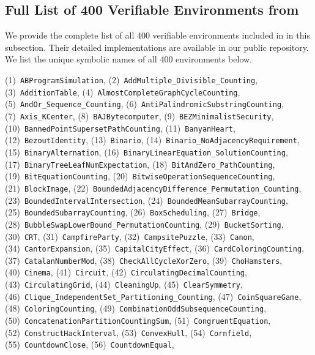 \documentclass{article}
\theoremstyle{plain}
\theoremstyle{definition}
\theoremstyle{remark}
\begin{document}
\subsection{Full List of 400 Verifiable Environments from~\suite{}}
\label{app:environment-list}

We provide the complete list of all 400 verifiable environments included in \suite{} in this subsection.
Their detailed implementations are available in our public repository.
We list the unique symbolic names of all 400 environments below.

\begin{flushleft}
(1)~\texttt{ABProgramSimulation},
(2)~\texttt{AddMultiple\_Divisible\_Counting},
(3)~\texttt{AdditionTable},
(4)~\texttt{AlmostCompleteGraphCycleCounting},
(5)~\texttt{AndOr\_Sequence\_Counting},
(6)~\texttt{AntiPalindromicSubstringCounting},
(7)~\texttt{Axis\_KCenter},
(8)~\texttt{BAJBytecomputer},
(9)~\texttt{BEZMinimalistSecurity},
(10)~\texttt{BannedPointSupersetPathCounting},
(11)~\texttt{BanyanHeart},
(12)~\texttt{BezoutIdentity},
(13)~\texttt{Binario},
(14)~\texttt{Binario\_NoAdjacencyRequirement},
(15)~\texttt{BinaryAlternation},
(16)~\texttt{BinaryLinearEquation\_SolutionCounting},
(17)~\texttt{BinaryTreeLeafNumExpectation},
(18)~\texttt{BitAndZero\_PathCounting},
(19)~\texttt{BitEquationCounting},
(20)~\texttt{BitwiseOperationSequenceCounting},
(21)~\texttt{BlockImage},
(22)~\texttt{BoundedAdjacencyDifference\_Permutation\_Counting},
(23)~\texttt{BoundedIntervalIntersection},
(24)~\texttt{BoundedMeanSubarrayCounting},
(25)~\texttt{BoundedSubarrayCounting},
(26)~\texttt{BoxScheduling},
(27)~\texttt{Bridge},
(28)~\texttt{BubbleSwapLowerBound\_PermutationCounting},
(29)~\texttt{BucketSorting},
(30)~\texttt{CRT},
(31)~\texttt{CampfireParty},
(32)~\texttt{CampsitePuzzle},
(33)~\texttt{Canon},
(34)~\texttt{CantorExpansion},
(35)~\texttt{CapitalCityEffect},
(36)~\texttt{CardColoringCounting},
(37)~\texttt{CatalanNumberMod},
(38)~\texttt{CheckAllCycleXorZero},
(39)~\texttt{ChoHamsters},
(40)~\texttt{Cinema},
(41)~\texttt{Circuit},
(42)~\texttt{CirculatingDecimalCounting},
(43)~\texttt{CirculatingGrid},
(44)~\texttt{CleaningUp},
(45)~\texttt{ClearSymmetry},
(46)~\texttt{Clique\_IndependentSet\_Partitioning\_Counting},
(47)~\texttt{CoinSquareGame},
(48)~\texttt{ColoringCounting},
(49)~\texttt{CombinationOddSubsequenceCounting},
(50)~\texttt{ConcatenationPartitionCountingSum},
(51)~\texttt{CongruentEquation},
(52)~\texttt{ConstructHackInterval},
(53)~\texttt{ConvexHull},
(54)~\texttt{Cornfield},
(55)~\texttt{CountdownClose},
(56)~\texttt{CountdownEqual},

\end{flushleft}
\end{document}
